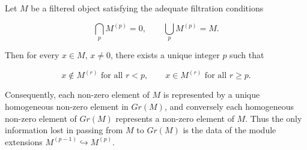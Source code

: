Let $M$ be a filtered object satisfying the adequate filtration conditions

$$\bigcap_p M^{(p)} = 0, \qquad \bigcup_p M^{(p)} = M.$$

Then for every $x \in M$, $x \neq 0$, there exists a unique integer $p$ such that

$$x \notin M^{(r)} \text{ for all } r < p, \qquad x \in M^{(r)} \text{ for all } r \geq p.$$

Consequently, each non-zero element of $M$ is represented by a unique homogeneous non-zero element in $Gr(M)$, and conversely each homogeneous non-zero element of $Gr(M)$ represents a non-zero element of $M$. Thus the only information lost in passing from $M$ to $Gr(M)$ is the data of the module extensions $M^{(p-1)} \hookrightarrow M^{(p)}$.
